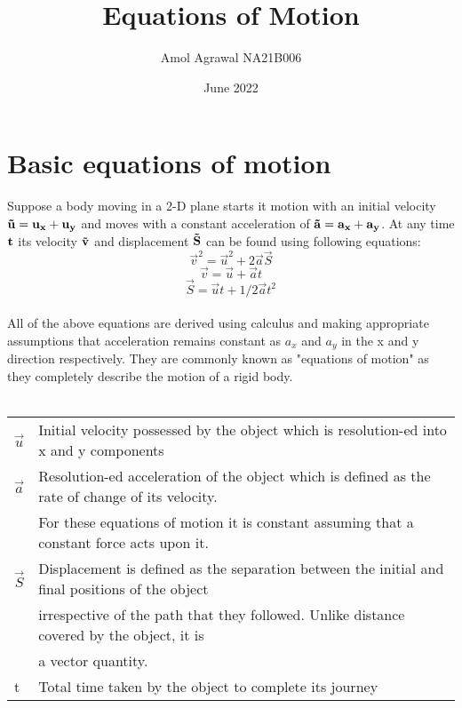 \documentclass{article}
\title{Equations of Motion}
\author{Amol Agrawal NA21B006}
\date{June 2022}
\begin{document}
\maketitle

\section{Basic equations of motion}
Suppose a body moving in a 2-D plane starts it motion with an initial velocity $\bf\vec u = u_x + u_y$ and moves with a constant acceleration of $\bf\vec a= a_x + a_y$. At any time $\bf t$ its velocity $\bf \vec v$ and displacement $\bf \vec S$ can be found using following equations:\\ 
\begin{equation}
    \vec v^2 = \vec u^2 + 2\vec a \vec S
\end{equation}
\begin{equation}
    \vec v = \vec u + \vec a  t
\end{equation}
\begin{equation}
    \vec S = \vec u t + 1/2 \vec a t^2
\end{equation}
\\
All of the above equations are derived using calculus and making appropriate assumptions that acceleration remains constant as $a_x$ and $a_y$ in the x and y direction respectively.
They are commonly known as "equations of motion" as they completely describe the motion of a rigid body.\\ \\
\begin{center}
\begin{tabular}{ |l|l| } 
 \hline
 $\vec u$ & Initial velocity possessed by the object which is resolution-ed into x and y components \\  
 $\vec a$ & Resolution-ed acceleration of the object which is defined as the rate of change of its velocity. \\ & For these equations of motion it is constant assuming that a constant force acts upon it.\\ 
 $\vec S$ & Displacement is defined as the separation between the initial and final positions of the object \\ & irrespective of the path that they followed. Unlike distance covered by the object, it is \\ & a vector quantity.\\ 
 t & Total time taken by the object to complete its journey\\
 \hline
\end{tabular}
\end{center}
\end{document}
